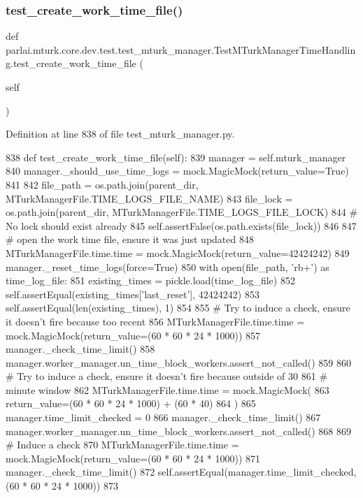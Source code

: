 \subsubsection{\texorpdfstring{test\+\_\+create\+\_\+work\+\_\+time\+\_\+file()}{test\_create\_work\_time\_file()}}
{\footnotesize\ttfamily def parlai.\+mturk.\+core.\+dev.\+test.\+test\+\_\+mturk\+\_\+manager.\+Test\+M\+Turk\+Manager\+Time\+Handling.\+test\+\_\+create\+\_\+work\+\_\+time\+\_\+file (\begin{DoxyParamCaption}\item[{}]{self }\end{DoxyParamCaption})}



Definition at line 838 of file test\+\_\+mturk\+\_\+manager.\+py.


\begin{DoxyCode}
838     \textcolor{keyword}{def }test\_create\_work\_time\_file(self):
839         manager = self.mturk\_manager
840         manager.\_should\_use\_time\_logs = mock.MagicMock(return\_value=\textcolor{keyword}{True})
841 
842         file\_path = os.path.join(parent\_dir, MTurkManagerFile.TIME\_LOGS\_FILE\_NAME)
843         file\_lock = os.path.join(parent\_dir, MTurkManagerFile.TIME\_LOGS\_FILE\_LOCK)
844         \textcolor{comment}{# No lock should exist already}
845         self.assertFalse(os.path.exists(file\_lock))
846 
847         \textcolor{comment}{# open the work time file, ensure it was just updated}
848         MTurkManagerFile.time.time = mock.MagicMock(return\_value=42424242)
849         manager.\_reset\_time\_logs(force=\textcolor{keyword}{True})
850         with open(file\_path, \textcolor{stringliteral}{'rb+'}) \textcolor{keyword}{as} time\_log\_file:
851             existing\_times = pickle.load(time\_log\_file)
852             self.assertEqual(existing\_times[\textcolor{stringliteral}{'last\_reset'}], 42424242)
853             self.assertEqual(len(existing\_times), 1)
854 
855         \textcolor{comment}{# Try to induce a check, ensure it doesn't fire because too recent}
856         MTurkManagerFile.time.time = mock.MagicMock(return\_value=(60 * 60 * 24 * 1000))
857         manager.\_check\_time\_limit()
858         manager.worker\_manager.un\_time\_block\_workers.assert\_not\_called()
859 
860         \textcolor{comment}{# Try to induce a check, ensure it doesn't fire because outside of 30}
861         \textcolor{comment}{# minute window}
862         MTurkManagerFile.time.time = mock.MagicMock(
863             return\_value=(60 * 60 * 24 * 1000) + (60 * 40)
864         )
865         manager.time\_limit\_checked = 0
866         manager.\_check\_time\_limit()
867         manager.worker\_manager.un\_time\_block\_workers.assert\_not\_called()
868 
869         \textcolor{comment}{# Induce a check}
870         MTurkManagerFile.time.time = mock.MagicMock(return\_value=(60 * 60 * 24 * 1000))
871         manager.\_check\_time\_limit()
872         self.assertEqual(manager.time\_limit\_checked, (60 * 60 * 24 * 1000))
873 
\end{DoxyCode}


